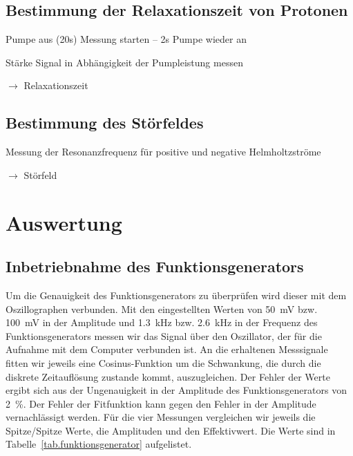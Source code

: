 \documentclass[paper=a4,
	fontsize=10pt,
	DIV=18,
	twocolumn,
	parskip=half
	]{scrartcl}
\numberwithin{equation}{section}    %
\newcommand{\tra}{$\rightarrow$}
\begin{document}
\subsection{Bestimmung der Relaxationszeit von Protonen}
\label{vorbereitung7}

\begin{compactitem}
	\item Pumpe aus (20s) Messung starten \--- 2s Pumpe wieder an
	\item Stärke Signal in Abhängigkeit der Pumpleistung messen
	\item[\tra] Relaxationszeit
\end{compactitem}
\subsection{Bestimmung des Störfeldes}
\label{vorbereitung8}

\begin{compactitem}
	\item Messung der Resonanzfrequenz für positive und negative Helmholtzströme
	\item[\tra] Störfeld
\end{compactitem}


%
\section{Auswertung}
\label{auswertung}
%
\subsection{Inbetriebnahme des Funktionsgenerators}
\label{auswertung1}

Um die Genauigkeit des Funktionsgenerators zu überprüfen wird dieser mit dem Oszillographen verbunden. Mit den eingestellten Werten von \SI{50}{\milli\volt} bzw. \SI{100}{\milli\volt} in der Amplitude und \SI{1.3}{\kilo\hertz} bzw. \SI{2.6}{\kilo\hertz} in der Frequenz des Funktionsgenerators messen wir das Signal über den Oszillator, der für die Aufnahme mit dem Computer verbunden ist. An die erhaltenen Messsignale fitten wir jeweils eine Cosinus-Funktion um die Schwankung, die durch die diskrete Zeitauflösung zustande kommt, auszugleichen. Der Fehler der Werte ergibt sich aus der Ungenauigkeit in der Amplitude des Funktionsgenerators von \SI{2}{\percent}. Der Fehler der Fitfunktion kann gegen den Fehler in der Amplitude vernachlässigt werden. Für die vier Messungen vergleichen wir jeweils die Spitze/Spitze Werte, die Amplituden und den Effektivwert. Die Werte sind in Tabelle~\ref{tab.funktionsgenerator} aufgelistet.
\end{document}
